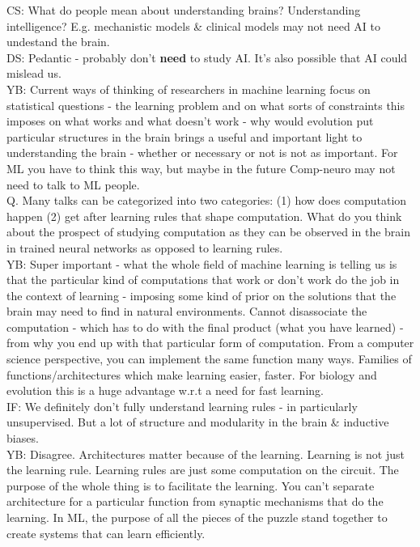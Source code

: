\documentclass[12pt]{article}
\begin{document}
CS: What do people mean about understanding brains? Understanding intelligence? E.g. mechanistic models \&  clinical models may not need AI to undestand the brain. \\

DS: Pedantic - probably don't \textbf{need} to study AI. It's also possible that AI could mislead us. \\

YB: Current ways of thinking of researchers in machine learning focus on statistical questions - the learning problem and on what sorts of constraints this imposes on what works and what doesn't work - why would evolution put particular structures in the brain brings a useful and important light to understanding the brain - whether or necessary or not is not as important. For ML you have to think this way, but maybe in the future Comp-neuro may not need to talk to ML people. \\

Q. Many talks can be categorized into two categories: (1) how does computation happen (2) get after learning rules that shape computation. What do you think about the prospect of studying computation as they can be observed in the brain in trained neural networks as opposed to learning rules. \\

YB: Super important - what the whole field of machine learning is telling us is that the particular kind of computations that work or don't work do the job in the context of learning - imposing some kind of prior on the solutions that the brain may need to find in natural environments. Cannot disassociate the computation - which has to do with the final product (what you have learned) - from why you end up with that particular form of computation. From a computer science perspective, you can implement the same function many ways. Families of functions/architectures which make learning easier, faster. For biology and evolution this is a huge advantage w.r.t a need for fast learning. \\

IF: We definitely don't fully understand learning rules - in particularly unsupervised. But a lot of structure and modularity in the brain & inductive biases. \\

YB: Disagree. Architectures matter because of the learning. Learning is not just the learning rule. Learning rules are just some computation on the circuit. The purpose of the whole thing is to facilitate the learning. You can't separate architecture for a particular function from synaptic mechanisms that do the learning. In ML, the purpose of all the pieces of the puzzle stand together to create systems that can learn efficiently. \\
\end{document}
